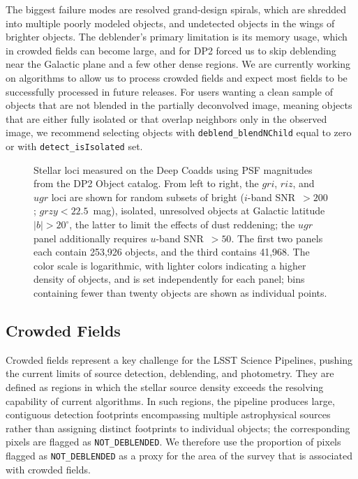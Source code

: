 The biggest failure modes are resolved grand-design spirals, which are shredded into multiple poorly modeled objects, and undetected objects in the wings of brighter objects.
The deblender's primary limitation is its memory usage, which in crowded fields can become large, and for \gls{DP2} forced us to skip deblending near the Galactic plane and a few other dense regions.
We are currently working on algorithms to allow us to process crowded fields and expect most fields to be successfully processed in future releases.
For users wanting a clean sample of objects that are not blended in the partially deconvolved image, meaning objects that are either fully isolated or that overlap neighbors only in the observed image, we recommend selecting objects with \texttt{deblend\_blendNChild} equal to zero or with \texttt{detect\_isIsolated} set.

\begin{figure}[htb!]
\caption{Stellar loci measured on the Deep Coadds using \gls{PSF} magnitudes from the \gls{DP2} Object catalog.
From left to right, the $gri$, $riz$, and $ugr$ loci are shown for random subsets of bright ($i$-band \gls{SNR}~$>200$; $grzy < 22.5$~mag), isolated, unresolved objects at Galactic latitude $|b|>20^\circ$, the latter to limit the effects of dust reddening; the $ugr$ panel additionally requires $u$-band \gls{SNR}~$>50$.
The first two panels each contain 253,926 objects, and the third contains 41,968.
The color scale is logarithmic, with lighter colors indicating a higher density of objects, and is set independently for each panel; bins containing fewer than twenty objects are shown as individual points.}
\label{fig:dp2_stellar_loci}
\end{figure}

\subsection{Crowded Fields}
Crowded fields represent a key challenge for the LSST \gls{Science Pipelines}, pushing the current limits of source detection, deblending, and photometry.
They are defined as regions in which the stellar source density exceeds the resolving capability of current algorithms.
In such regions, the \gls{pipeline} produces large, contiguous detection footprints encompassing multiple astrophysical sources rather than assigning distinct footprints to individual objects; the corresponding pixels are flagged as \texttt{NOT\_DEBLENDED}.
We therefore use the proportion of pixels flagged as \texttt{NOT\_DEBLENDED} as a proxy for the area of the survey that is associated with crowded fields.

